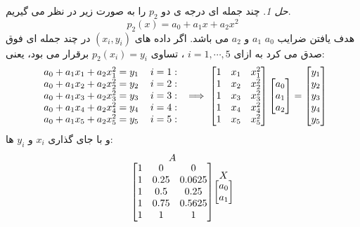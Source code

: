 \documentclass{article}
\theoremstyle{remark}		%
\newtheorem*{varsol}{حل}
\begin{document}
\begin{varsol}
	چند جمله ای درجه ی دو $p_2$ را به صورت زیر در نظر می گیریم.
	\[
	p_2(x) = a_0  + a_1 x + a_2 x^2
	\]
	هدف یافتن ضرایب $a_0$ $a_1$ و $a_2$ می باشد. اگر داده های $(x_i, y_i)$ در چند جمله ای فوق صدق می کرد به ازای $i=1,\cdots ,5$ ، تساوی $p_2(x_i) = y_i $ برقرار می بود، یعنی: \\
	\begin{equation*}
	\begin{tabular}{c c }
		 $a_0 +a_1x_1 + a_2x_1^2 = y_1$ & $i=1:$ \\
		 $a_0 + a_1x_2 + a_2x_2^2 = y_2$  & $i= 2:$ \\
		 $a_0 + a_1x_3 + a_2x_3^2 = y_3$  & $i= 3:$ \\
		 $a_0 + a_1x_4 + a_2x_4^2 = y_4$  & $i= 4:$ \\
		 $a_0 + a_1x_5 + a_2x_5^2 = y_5$  & $i= 5:$ 
	\end{tabular} \implies 
\begin{bmatrix}
	1 & x_1 & x_1^2 \\
	1 & x_2 & x_2^2 \\
	1 & x_3 & x_3^2 \\
	1 & x_4 & x_4^2 \\
	1 & x_5 & x_5^2
\end{bmatrix}
\begin{bmatrix}
	a_0\\
	a_1\\
	a_2
\end{bmatrix} = 
\begin{bmatrix}
	y_1 \\
	y_2 \\
	y_3 \\
	y_4 \\ 
	y_5
\end{bmatrix}
	\end{equation*}
و با جای گذاری $x_i$ و $y_i$ ها: \\
\begin{equation}
	\stackrel{\mbox{$A$}}{%
	\begin{bmatrix}
		1 & 0 & 0 \\
		1 & $0.25$ & $0.0625$ \\
		1 & $0.5$ & $0.25$ \\
		1 & $0.75$ & $0.5625$ \\
		1 & 1 & 1
	\end{bmatrix}
}
	\stackrel{\mbox{$X$}}{%
	\begin{bmatrix}
		a_0 \\
		a_1 \\

\end{bmatrix}}
\end{equation}
\end{varsol}
\end{document}
